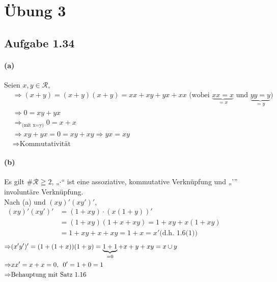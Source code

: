 \documentclass[10pt, a4paper]{article}
\begin{document}
\section{Übung 3}
\subsection{Aufgabe 1.34}
\paragraph*{(a)}
Seien $x,y \in \mathcal{R} $,
\begin{align*}
	&\Rightarrow (x+y)=(x+y)(x+y)=xx+xy+yx+xx \text{ (wobei $\underbrace{xx=x}_{=x}$ und $\underbrace{yy=y}_{=y}$)}	\\
	&\Rightarrow 0=xy+yx	\\
	&\Rightarrow_\text{(mit x=y)} 0=x+x		\\
	&\Rightarrow xy+yx=0=xy+xy \Rightarrow yx=xy	\\
	& \Rightarrow \text{Kommutativität}
\end{align*}

\paragraph*{(b)}
Es gilt $\#\mathcal{R} \geqq 2$, „$\cdot$“ ist eine assoziative, kommutative Verknüpfung und „'” involuntäre Verknüpfung. \\
Nach (a) und $(xy)'(xy')'$, 
\begin{align*}
	(xy)'(xy')' & =(1+xy)\cdot(x(1+y))'	\hspace{3in}\\
	& =(1+xy)(1+x+xy)=1+xy+x(1+xy)	\\
	& =1+xy+x+xy=1+x=x' 	\text{(d.h. 1.6(1))}	
\end{align*}
\begin{align*}
	\Rightarrow & (x'y')'=(1+(1+x))(1+y)=\underbrace{1+1}_{=0}+x+y+xy=x \cup y	\hspace{1.75in}\\
	\Rightarrow & xx'=x+x=0, \hspace{5pt} 0'=1+0=1	\\
	\Rightarrow & \text{Behauptung mit Satz 1.16}
\end{align*}
\end{document}
